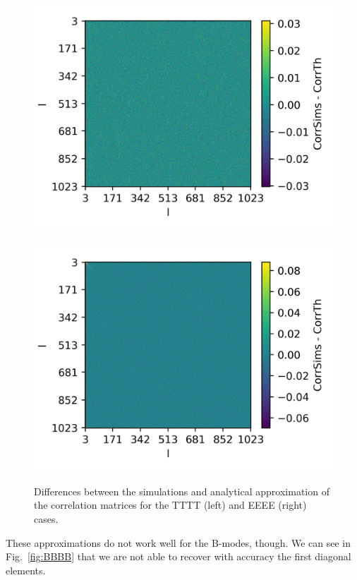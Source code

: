 \documentclass[a4paper,11pt]{article}
\begin{document}
\begin{figure} %
  \centering
  \includegraphics[width=\columnwidth]{./figures/run_sph_Efstathiou_TTTT_correlation_difference.png}~
  \includegraphics[width=\columnwidth]{./figures/run_sph_Efstathiou_EEEE_correlation_difference.png}
  \caption{Differences between the simulations and analytical approximation of
    the correlation matrices for the TTTT (left) and EEEE (right) cases.}
  \label{fig:TTTT_EEEE_corr}
\end{figure}

These approximations do not work well for the B-modes, though. We can see in
Fig.~\ref{fig:BBBB} that we are not able to recover with accuracy the first
diagonal elements.
\end{document}
